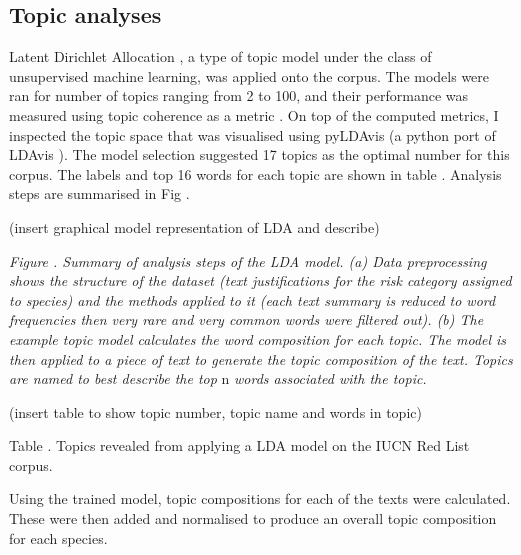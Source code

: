 \subsection{Topic analyses}

Latent Dirichlet Allocation \parencite{blei2003latent}, a type of topic model under the class of unsupervised machine learning, was applied onto the corpus. The models were ran for number of topics ranging from 2 to 100, and their performance was measured using topic coherence as a metric \parencite{roder2015exploring}. On top of the computed metrics, I inspected the topic space that was visualised using pyLDAvis (a python port of LDAvis \parencite{sievert2014ldavis}). The model selection suggested 17 topics as the optimal number for this corpus. The labels and top 16 words for each topic are shown in table . Analysis steps are summarised in Fig .

(insert graphical model representation of LDA and describe)

\textit{Figure . Summary of analysis steps of the LDA model. (a) Data preprocessing shows the structure of the dataset (text justifications for the risk category assigned to species) and the methods applied  to it (each text summary is reduced to word frequencies then very rare and very common words were filtered out). (b) The example topic model calculates the word composition for each topic. The model is then applied to a piece of text to generate the topic composition of the text. Topics are named to best describe the top} n \textit{words associated with the topic.}

(insert table to show topic number, topic name and words in topic)

Table . Topics revealed from applying a LDA model on the IUCN Red List corpus.

Using the trained model, topic compositions for each of the texts were calculated. These were then added and normalised to produce an overall topic composition for each species.


